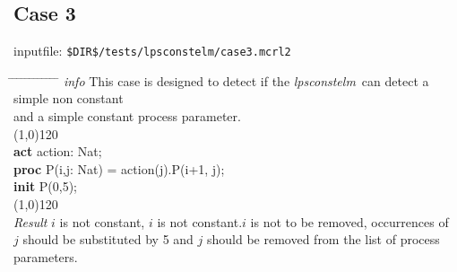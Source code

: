 \index{}\documentclass[a4paper,10pt]{article}
\theoremstyle{plain}
\theoremstyle{definition}
\newcommand{\tool}{\textit{lpsconstelm}}
\newcommand{\pp}{process parameter}
\newcommand{\pps}{process parameters}
\newcommand{\ti}{\textit}
\newcommand{\tb}{\textbf}
\newcommand{\tabw}{\hspace*{15.mm} \= \hspace*{20.mm} \= \hspace*{5.mm} \= \hspace*{5.mm} \= \hspace*{5.mm} \= \hspace*{5.mm}  \= \hspace*{5.mm}  \= \hspace*{5.mm}  \= \hspace*{5.mm} \= \hspace*{5.mm} \= \hspace*{5.mm}  \= \hspace*{5.mm}  \= \hspace*{5.mm}\kill}
\begin{document}
\subsection*{Case 3}
inputfile: \verb"$DIR$/tests/lpsconstelm/case3.mcrl2"
\begin{tabbing}
\tabw
\ti{info} 
\> This case is designed to detect if the \tool\ can detect a simple non constant \\
\> and a simple constant \pp .\\
\line(1,0){120}\\
\tb{act}  \> action: Nat;\\
\tb{proc} \> P(i,j: Nat) \> = \> action(j).P(i+1, j);\\
\tb{init} \> P(0,5);\\
\line(1,0){120}\\
\ti{Result} \> $i$ is not constant, $i$ is not constant.$i$ is not to be removed, occurrences of \\
\> $j$ should be substituted by 5 and $j$ should be removed from the list of \pps .\\ 
\end{tabbing}
\end{document}

